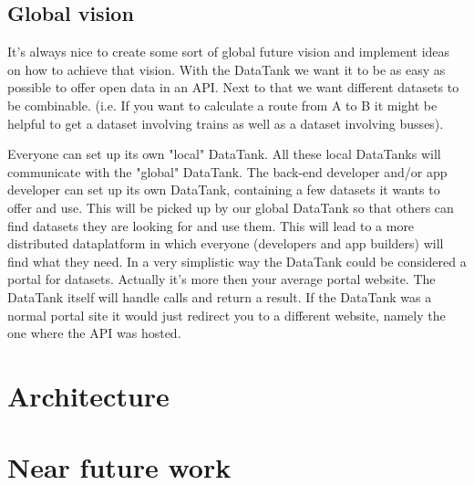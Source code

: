 \documentclass[12pt]{book}
\begin{document}
\section{Global vision} 
It's always nice to create some sort of global future vision and implement ideas on how to achieve that vision. With the DataTank we want it to be as easy as possible to offer open data in an API. Next to that we want different datasets to be combinable. (i.e. If you want to calculate a route from A to B it might be helpful to get a dataset involving trains as well as a dataset involving busses). 

Everyone can set up its own "local" DataTank. All these local DataTanks will communicate with the "global" DataTank. The back-end developer and/or app developer can set up its own DataTank, containing a few datasets it wants to offer and use. This will be picked up by our global DataTank so that others can find datasets they are looking for and use them. This will lead to a more distributed dataplatform in which everyone (developers and app builders) will find what they need. In a very simplistic way the DataTank could be considered a portal for datasets. Actually it's more then your average portal website. The DataTank itself will handle calls and return a result. If the DataTank was a normal portal site it would just redirect you to a different website, namely the one where the API was hosted.

\chapter{Architecture}

\chapter{Near future work}
\end{document}
